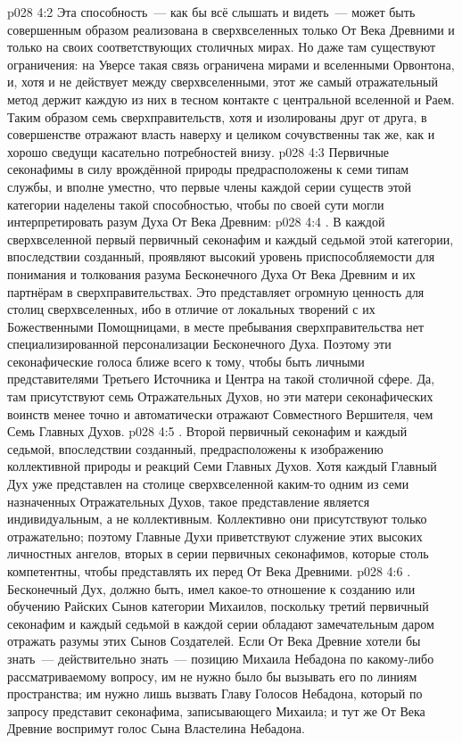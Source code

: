\vs p028 4:2 Эта способность~--- как бы всё слышать и видеть~--- может быть совершенным образом реализована в сверхвселенных только От Века Древними и только на своих соответствующих столичных мирах. Но даже там существуют ограничения: на Уверсе такая связь ограничена мирами и вселенными Орвонтона, и, хотя и не действует между сверхвселенными, этот же самый отражательный метод держит каждую из них в тесном контакте с центральной вселенной и Раем. Таким образом семь сверхправительств, хотя и изолированы друг от друга, в совершенстве отражают власть наверху и целиком сочувственны так же, как и хорошо сведущи касательно потребностей внизу.
\vs p028 4:3 \pc Первичные секонафимы в силу врождённой природы предрасположены к семи типам службы, и вполне уместно, что первые члены каждой серии существ этой категории наделены такой способностью, чтобы по своей сути могли интерпретировать разум Духа От Века Древним:
\vs p028 4:4 . В каждой сверхвселенной первый первичный секонафим и каждый седьмой этой категории, впоследствии созданный, проявляют высокий уровень приспособляемости для понимания и толкования разума Бесконечного Духа От Века Древним и их партнёрам в сверхправительствах. Это представляет огромную ценность для столиц сверхвселенных, ибо в отличие от локальных творений с их Божественными Помощницами, в месте пребывания сверхправительства нет специализированной персонализации Бесконечного Духа. Поэтому эти секонафические голоса ближе всего к тому, чтобы быть личными представителями Третьего Источника и Центра на такой столичной сфере. Да, там присутствуют семь Отражательных Духов, но эти матери секонафических воинств менее точно и автоматически отражают Совместного Вершителя, чем Семь Главных Духов.
\vs p028 4:5 . Второй первичный секонафим и каждый седьмой, впоследствии созданный, предрасположены к изображению коллективной природы и реакций Семи Главных Духов. Хотя каждый Главный Дух уже представлен на столице сверхвселенной каким\hyp{}то одним из семи назначенных Отражательных Духов, такое представление является индивидуальным, а не коллективным. Коллективно они присутствуют только отражательно; поэтому Главные Духи приветствуют служение этих высоких личностных ангелов, вторых в серии первичных секонафимов, которые столь компетентны, чтобы представлять их перед От Века Древними.
\vs p028 4:6 . Бесконечный Дух, должно быть, имел какое\hyp{}то отношение к созданию или обучению Райских Сынов категории Михаилов, поскольку третий первичный секонафим и каждый седьмой в каждой серии обладают замечательным даром отражать разумы этих Сынов Создателей. Если От Века Древние хотели бы знать~--- действительно знать~--- позицию Михаила Небадона по какому\hyp{}либо рассматриваемому вопросу, им не нужно было бы вызывать его по линиям пространства; им нужно лишь вызвать Главу Голосов Небадона, который по запросу представит секонафима, записывающего Михаила; и тут же От Века Древние воспримут голос Сына Властелина Небадона.
